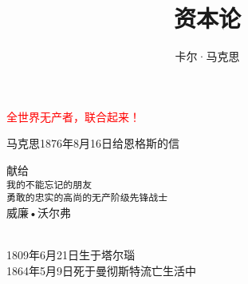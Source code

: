 \documentclass{ctexbook}
\title{资本论}
\author{卡尔·马克思}
\begin{document}

\begin{figure}[ht]
    \begin{center}
        
    \end{center}
\end{figure}

\thispagestyle{empty}
\clearpage


\vspace*{\fill}
    \begin{center}
        \large{\textcolor{red}{全世界无产者，联合起来！}}
    \end{center}
\vspace*{\fill}

\thispagestyle{empty}

\newpage
\mbox{}
\thispagestyle{empty}
\clearpage
\newpage




\vspace*{\fill}
    \begin{center}
    \end{center}
\vspace*{\fill}

\thispagestyle{empty}

\newpage
\mbox{}
\thispagestyle{empty}
\clearpage
\newpage





\setcounter{tocdepth}{5}%
\setcounter{secnumdepth}{4}%

\setcounter{page}{1}

\tableofcontents

\clearpage


\vspace*{\fill}
    \begin{center}
        马克思1876年8月16日给恩格斯的信
    \end{center}
\vspace*{\fill}

\thispagestyle{empty}
\clearpage


\vspace*{\fill}
    \begin{center}
        \large{献\hspace{2em}给\\
        \texttt{我的不能忘记的朋友\\
        勇敢的忠实的高尚的无产阶级先锋战士}}\\
        \LARGE{威廉•沃尔弗}

        \normalsize{~\\ 

        1809年6月21日生于塔尔瑙\\
        1864年5月9日死于曼彻斯特流亡生活中}
    \end{center}
\vspace*{\fill}
\end{document}
